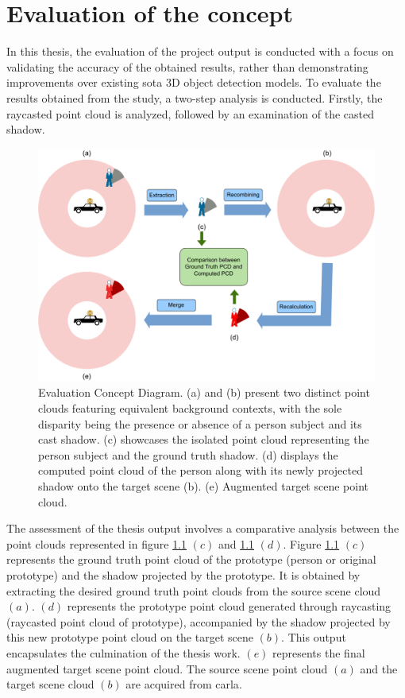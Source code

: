 \chapter{Evaluation of the concept}
In this thesis, the evaluation of the project output is conducted with a focus on validating the accuracy of the obtained results, rather than demonstrating improvements over existing \acrshort{sota} 3D object detection models.
To evaluate the results obtained from the study, a two-step analysis is conducted. Firstly, the raycasted point cloud is analyzed, followed by an examination of the casted shadow.

\begin{figure}[htb]
    \centering
    \includegraphics[width=0.75\linewidth]{97_graphics//evaluation/evaluation_step_diagram.pdf}
    \caption[Evaluation Concept Diagram.]{Evaluation Concept Diagram. (a) and (b) present two distinct point clouds featuring equivalent background contexts, with the sole disparity being the presence or absence of a person subject and its cast shadow. (c) showcases the isolated point cloud representing the person subject and the ground truth shadow. (d) displays the computed point cloud of the person along with its newly projected shadow onto the target scene (b). (e) Augmented target scene point cloud.} 
    \label{fig:evaluation-evaluation_step_diagram}
\end{figure}

 The assessment of the thesis output involves a comparative analysis between the point clouds represented in figure \ref{fig:evaluation-evaluation_step_diagram} \((c)\) and \ref{fig:evaluation-evaluation_step_diagram} \((d)\). Figure \ref{fig:evaluation-evaluation_step_diagram} \((c)\) represents the ground truth point cloud of the prototype (person or original prototype) and the shadow projected by the prototype. It is obtained by extracting the desired ground truth point clouds from the source scene cloud \((a)\). \((d)\) represents the prototype point cloud generated through raycasting (raycasted point cloud of prototype), accompanied by the shadow projected by this new prototype point cloud on the target scene \((b)\). This output encapsulates the culmination of the thesis work.
\((e)\) represents the final augmented target scene point cloud. The source scene point cloud \((a)\) and the target scene cloud \((b)\) are acquired from \acrshort{carla}.


